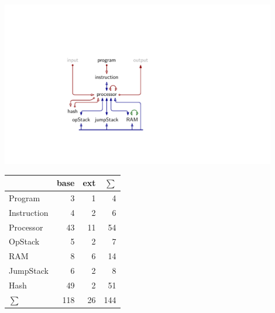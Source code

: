 \documentclass{article}
\begin{document}
\begin{minipage}[][0.84\textheight][s]{0.6\textwidth}
    \hfill
    \includegraphics[keepaspectratio,width=0.9\textwidth]{src/img/aet-relations.pdf}
    \vfill

    \hfill
    \begin{tabular}{lrrr}
        \toprule
                    & base & ext & $\sum$ \\ \midrule
        Program     &    3 &   1 &      4 \\
        Instruction &    4 &   2 &      6 \\
        Processor   &   43 &  11 &     54 \\
        OpStack     &    5 &   2 &      7 \\
        RAM         &    8 &   6 &     14 \\
        JumpStack   &    6 &   2 &      8 \\
        Hash        &   49 &   2 &     51 \\ \bottomrule\bottomrule
        $\sum$      &  118 &  26 &    144
    \end{tabular}
\end{minipage}
\end{document}
